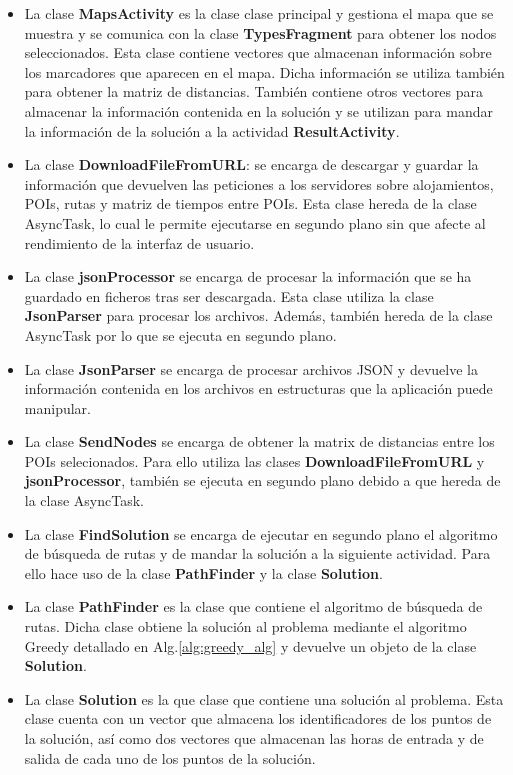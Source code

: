 \begin{itemize}
	\item La clase \textbf{MapsActivity} es la clase clase principal y gestiona el mapa que se muestra y se comunica con la clase \textbf{TypesFragment} para obtener los nodos seleccionados. Esta clase contiene vectores que almacenan información sobre los marcadores que aparecen en el mapa. Dicha información se utiliza también para obtener la matriz de distancias. También contiene otros vectores para almacenar la información contenida en la solución y se utilizan para mandar la información de la solución a la actividad \textbf{ResultActivity}.
	\item La clase \textbf{DownloadFileFromURL}: se encarga de descargar y guardar la información que devuelven las peticiones a los servidores sobre alojamientos, POIs, rutas y matriz de tiempos entre POIs. Esta clase hereda de la clase AsyncTask, lo cual le permite ejecutarse en segundo plano sin que afecte al rendimiento de la interfaz de usuario.
	\item La clase \textbf{jsonProcessor} se encarga de procesar la información que se ha guardado en ficheros tras ser descargada. Esta clase utiliza la clase \textbf{JsonParser} para procesar los archivos. Además, también hereda de la clase AsyncTask por lo que se ejecuta en segundo plano.
	\item La clase \textbf{JsonParser} se encarga de procesar archivos JSON y devuelve la información contenida en los archivos en estructuras que la aplicación puede manipular.
	\item La clase \textbf{SendNodes} se encarga de obtener la matrix de distancias entre los POIs selecionados. Para ello utiliza las clases \textbf{DownloadFileFromURL} y\textbf{ jsonProcessor}, también se ejecuta en segundo plano debido a que hereda de la clase AsyncTask.
	\item La clase\textbf{ FindSolution} se encarga de ejecutar en segundo plano el algoritmo de búsqueda de rutas y de mandar la solución a la siguiente actividad. Para ello hace uso de la clase \textbf{PathFinder} y la clase \textbf{Solution}.
	\item La clase \textbf{PathFinder} es la clase que contiene el algoritmo de búsqueda de rutas. Dicha clase obtiene la solución al problema mediante el algoritmo Greedy detallado en Alg.\ref{alg:greedy_alg} y devuelve un objeto de la clase \textbf{Solution}.
	\item La clase \textbf{Solution} es la que clase que contiene una solución al problema. Esta clase cuenta con un vector que almacena los identificadores de los puntos de la solución, así como dos vectores que almacenan las horas de entrada y de salida de cada uno de los puntos de la solución.
\end{itemize}
